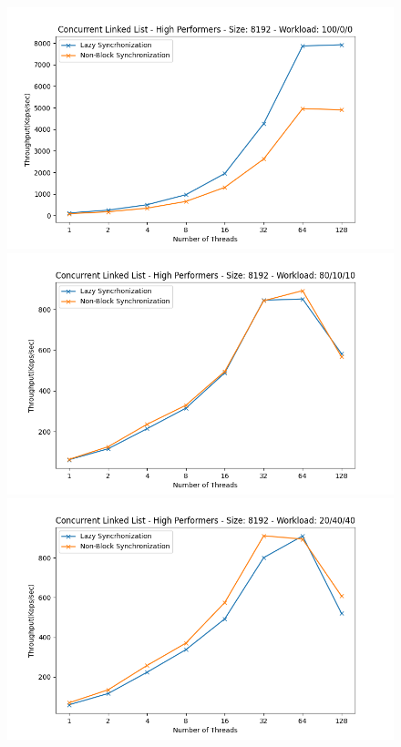 \documentclass[../final_report.tex]{subfiles}
\begin{document}
\begin{figure}[H]
    \centering
        \includegraphics[scale=0.4]{outFiles/plots/concurrent_data_structs_high_8192_100_0_0.png}
        \includegraphics[scale=0.4]{outFiles/plots/concurrent_data_structs_high_8192_80_10_10.png}
        \includegraphics[scale=0.4]{outFiles/plots/concurrent_data_structs_high_8192_20_40_40.png}

\end{figure}
\end{document}
